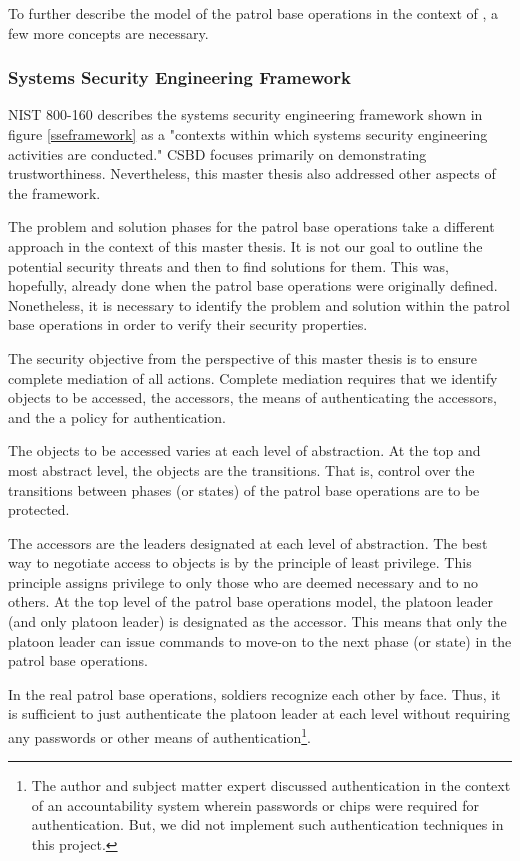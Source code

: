\documentclass[../../main/main.tex]{subfiles}
\begin{document}
To further describe the model of the patrol base operations in the context of , a few more concepts are necessary.  

\subsubsection{Systems Security Engineering Framework}\label{sssec:sseframework}
NIST 800-160 describes the systems security engineering framework shown in figure \ref{sseframework} as a "contexts within which systems security engineering activities are conducted."  CSBD focuses primarily on demonstrating trustworthiness.  Nevertheless, this master thesis also addressed other aspects of the framework.  

The problem and solution phases for the patrol base operations take a different approach in the context of this master thesis. It is not our goal to outline the potential security threats and then to find solutions for them.  This was, hopefully, already done when the patrol base operations were originally defined.  Nonetheless, it is necessary to identify the problem and solution within the patrol base operations in order to verify their security properties.  

The security objective from the perspective of this master thesis is to ensure complete mediation of all actions.  Complete mediation requires that we identify objects to be accessed, the accessors, the means of authenticating the accessors, and the a policy for authentication.  

The objects to be accessed varies at each level of abstraction. At the top and most abstract level, the objects are the transitions.  That is, control over the transitions between phases (or states) of the patrol base operations are to be protected.  

The accessors are the leaders designated at each level of abstraction.  The best way to negotiate access to objects is by the principle of least privilege.  This principle assigns privilege to only those who are deemed necessary and to no others.  At the top level of the patrol base operations model, the platoon leader (and only platoon leader) is designated as the accessor. This means that only the platoon leader can issue commands to move-on to the next phase (or state) in the patrol base operations. 

In the real patrol base operations, soldiers recognize each other by face.  Thus, it is sufficient to just authenticate the platoon leader at each level without requiring any passwords or other means of authentication\footnote{The author and subject matter expert discussed authentication in the context of an accountability system wherein passwords or chips were required for authentication.  But, we did not implement such authentication techniques in this project.}.
\end{document}
